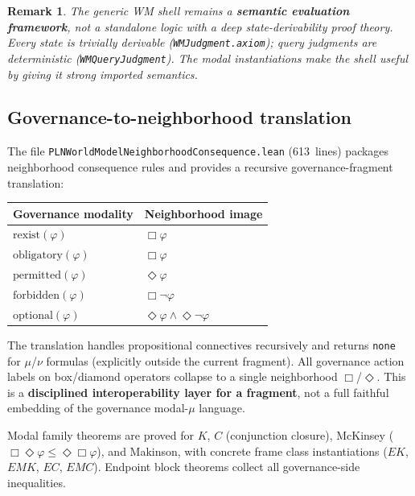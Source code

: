 \documentclass[]{article}
\newtheorem{remark}[theorem]{Remark}
\newcommand{\code}[1]{\texttt{#1}}
\begin{document}
\begin{remark}
The generic WM shell remains a \textbf{semantic evaluation framework},
not a standalone logic with a deep state-derivability proof theory.
Every state is trivially derivable
(\code{WMJudgment.axiom}); query judgments are deterministic
(\code{WMQueryJudgment}). The modal instantiations make the shell
\emph{useful} by giving it strong imported semantics.
\end{remark}


\subsection{Governance-to-neighborhood translation}
\label{sec:gov-translation}

The file \code{PLNWorldModelNeighborhoodConsequence.lean} (613~lines)
packages neighborhood consequence rules and provides a recursive
governance-fragment translation:

\begin{center}
\begin{tabular}{ll}
\toprule
\textbf{Governance modality} & \textbf{Neighborhood image} \\
\midrule
$\mathrm{rexist}(\varphi)$ & $\Box\varphi$ \\
$\mathrm{obligatory}(\varphi)$ & $\Box\varphi$ \\
$\mathrm{permitted}(\varphi)$ & $\Diamond\varphi$ \\
$\mathrm{forbidden}(\varphi)$ & $\Box\lnot\varphi$ \\
$\mathrm{optional}(\varphi)$ & $\Diamond\varphi \wedge \Diamond\lnot\varphi$ \\
\bottomrule
\end{tabular}
\end{center}

\noindent
The translation handles propositional connectives recursively and returns
\code{none} for $\mu$/$\nu$ formulas (explicitly outside the current
fragment). All governance action labels on box/diamond operators collapse
to a single neighborhood $\Box$/$\Diamond$. This is a \textbf{disciplined
interoperability layer for a fragment}, not a full faithful embedding of
the governance modal-$\mu$ language.

Modal family theorems are proved for $K$, $C$ (conjunction closure),
McKinsey ($\Box\Diamond\varphi \le \Diamond\Box\varphi$), and Makinson,
with concrete frame class instantiations ($EK$, $EMK$, $EC$, $EMC$).
Endpoint block theorems collect all governance-side inequalities.
\end{document}
